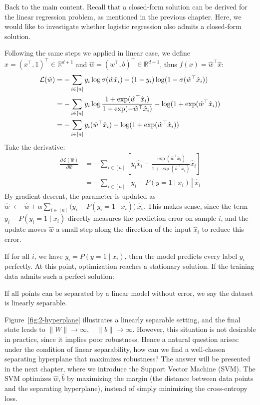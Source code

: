 \documentclass[../main]{subfiles}
\begin{document}
\vspace{1em}
Back to the main content. Recall that a closed-form solution can be derived for the linear regression problem, as mentioned in the previous chapter. Here, we would like to investigate whether logistic regression also admits a closed-form solution.

Following the same steps we applied in linear case, we define $\hat x=(x^\top,1)^\top\in\mathbb R^{d+1}$ and $\hat w=(w^\top,b)^{\top}\in\mathbb R^{d+1}$, thus $f(x)=\hat w^\top \hat x$:
\begin{align}
  \mathcal L(\hat w)&=-\sum_{i\in[n]}y_i\log\sigma(\hat w\hat x_i)+(1-y_i)\log(1-\sigma(\hat w^\top\hat x_i))\notag\\
  &=-\sum_{i\in[n]}y_i\log\frac{1+\exp(\hat w^\top\hat x_i)}{1+\exp(-\hat w^\top\hat x_i)}-\log(1+\exp(\hat w^\top\hat x_i))\notag\\
  &=-\sum_{i\in[n]}y_i(\hat w^\top\hat x_i)-\log(1+\exp(\hat w^\top\hat x_i))
\end{align}
Take the derivative:
\begin{align}
  \frac{\partial\mathcal L(\hat w)}{\partial \hat w}&=-\sum_{i\in[n]}\left[y_i\hat x_i-\frac{\exp(\hat w^\top\hat x_i)}{1+\exp(\hat w^\top\hat x_i)}\hat x_i\right]\\
  &=-\sum_{i\in [n]}\left[y_i-P(y=1\mid x_i)\right]\hat x_i
\end{align}
By gradient descent, the parameter is updated as $
  \hat w \;\leftarrow\; \hat w + \alpha \sum_{i \in [n]} \Big(y_i - P(y_i=1 \mid x_i)\Big)\,\hat x_i .$
This makes sense, since the term $y_i - P(y_i=1 \mid x_i)$ directly measures the prediction error on sample $i$, and the update moves $\hat w$ a small step along the direction of the input $\hat x_i$ to reduce this error.

If for all $i$, we have $y_i = P(y=1 \mid x_i)$, then the model predicts every label $y_i$ perfectly. At this point, optimization reaches a stationary solution. If the training data admits such a perfect solution:
\begin{definition}
  If all points can be separated by a linear model without error, we say the dataset is {linearly separable}.
\end{definition}

Figure~\ref{fig:2-hyperplane} illustrates a linearly separable setting, and the final state leads to $\|W\| \to \infty, \quad \|b\| \to \infty$. However, this situation is not desirable in practice, since it implies poor robustness. Hence a natural question arises: under the condition of linear separability, how can we find a well-chosen separating hyperplane that maximizes robustness? The answer will be presented in the next chapter, where we introduce the Support Vector Machine (SVM). The SVM optimizes $\hat w, \hat b$ by maximizing the margin (the distance between data points and the separating hyperplane), instead of simply minimizing the cross-entropy loss.
\end{document}
